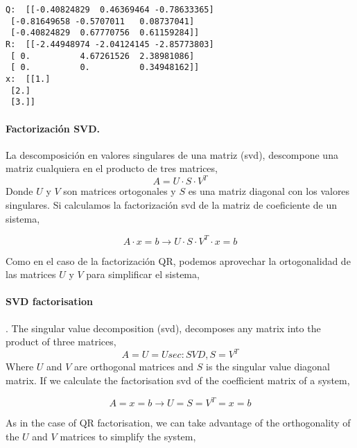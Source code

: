 \begin{verbatim}
Q:  [[-0.40824829  0.46369464 -0.78633365]
 [-0.81649658 -0.5707011   0.08737041]
 [-0.40824829  0.67770756  0.61159284]]
R:  [[-2.44948974 -2.04124145 -2.85773803]
 [ 0.          4.67261526  2.38981086]
 [ 0.          0.          0.34948162]]
x:  [[1.]
 [2.]
 [3.]]  
\end{verbatim}

\begin{paracol}{2}
\paragraph{Factorización SVD.} La  descomposición en valores singulares de una matriz (svd), descompone una matriz cualquiera en el producto de tres matrices,
\begin{equation*}
A=U\cdot S\cdot V^T
\end{equation*}
Donde $U$ y $V$ son matrices ortogonales y $S$ es una matriz diagonal con los valores singulares. Si calculamos la factorización svd de la matriz de coeficiente de un sistema,

\begin{equation*}
A\cdot x=b \rightarrow U\cdot S\cdot V^T\cdot x=b
\end{equation*}

Como en el caso de la factorización QR, podemos aprovechar la ortogonalidad de las matrices $U$ y $V$ para simplificar el sistema,

\switchcolumn
\paragraph{SVD factorisation}. The singular value decomposition (svd), decomposes any matrix into the product of three matrices,
\begin{equation}
A=U=U{sec:SVD}, S=V^T
\end{equation}
Where $U$ and $V$ are orthogonal matrices and $S$ is the singular value diagonal matrix. If we calculate the factorisation svd of the coefficient matrix of a system,

\begin{equation}
A = x=b \rightarrow U = S = V^T = x=b
\end{equation}

As in the case of QR factorisation, we can take advantage of the orthogonality of the $U$ and $V$ matrices to simplify the system,

\end{paracol}


